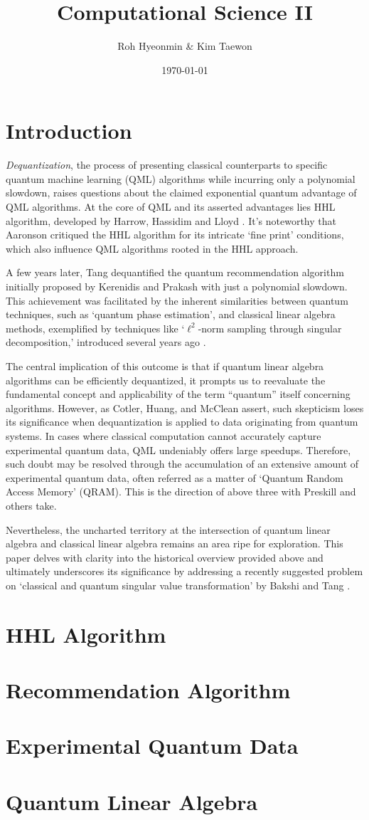 \documentclass[a4paper,atbegshi,openany]{memoir}
\title{Computational Science II}
\author{Roh Hyeonmin \& Kim Taewon}
\date{\today}
\begin{document}
\maketitle\thispagestyle{empty}
\newpage
\tableofcontents
\chapter{Introduction}
\emph{Dequantization}, the process of presenting classical counterparts to 
specific quantum machine learning (QML) algorithms while incurring only a
polynomial slowdown, raises questions about the claimed exponential quantum
advantage of QML algorithms. At the core of QML and its asserted advantages
lies HHL algorithm, developed by Harrow, Hassidim and Lloyd \cite{HHL2009}.
It's noteworthy that Aaronson \cite{Aaronson2015} critiqued the HHL algorithm for
its intricate `fine print' conditions, which also influence QML algorithms
rooted in the HHL approach. 

A few years later, Tang \cite{Tang2019} dequantified the quantum recommendation
algorithm initially proposed by Kerenidis and Prakash \cite{KP2017} with just
a polynomial slowdown. This achievement was facilitated by the inherent
similarities between quantum techniques, such as `quantum phase estimation',
and classical linear algebra methods, exemplified by techniques like 
`$\ell^2$-norm sampling through singular decomposition,' introduced several
years ago \cite{Frieze2004}.

The central implication of this outcome is that if quantum linear algebra
algorithms can be efficiently dequantized, it prompts us to reevaluate the 
fundamental concept and applicability of the term ``quantum'' itself concerning
algorithms. However, as Cotler, Huang, and McClean \cite{Cotler2021} assert,
such skepticism loses its significance when dequantization is applied to data
originating from quantum systems. In cases where classical computation cannot
accurately capture experimental quantum data, QML undeniably offers large
speedups. Therefore, such doubt may be resolved through the accumulation of an
extensive amount of experimental quantum data, often referred as a matter of 
`Quantum Random Access Memory' (QRAM). This is the direction of above three
with Preskill and others \cite{Huang2022} take.

Nevertheless, the uncharted territory at the intersection of quantum linear 
algebra and classical linear algebra remains an area ripe for exploration. This
paper delves with clarity into the historical overview provided above and 
ultimately underscores its significance by addressing a recently suggested 
problem on `classical and quantum singular value transformation' by Bakshi and
Tang \cite{Bakshi2023}.
\chapter{HHL Algorithm}
\chapter{Recommendation Algorithm}
\chapter{Experimental Quantum Data}
\chapter{Quantum Linear Algebra}


\end{document}
